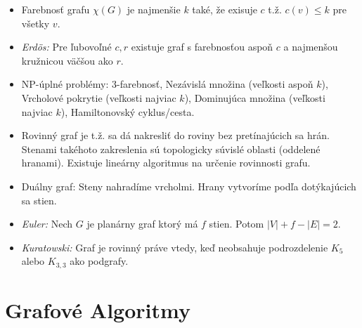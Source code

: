 \documentclass[paper=a4, fontsize=11pt]{scrartcl} %
\numberwithin{equation}{section} %
\numberwithin{figure}{section} %
\numberwithin{table}{section} %
\begin{document}
\begin{itemize}
		\item Farebnosť grafu $\chi(G)$ je najmenšie $k$ také, že exisuje $c$ t.ž. $c(v) \leq k$ pre všetky $v$.
		
		\item \emph{Erdös:} Pre ľubovoľné $c,r$ existuje graf s farebnosťou aspoň $c$ a najmenšou kružnicou väčšou ako $r$.
		
		\item NP-úplné problémy: 3-farebnosť, Nezávislá množina (veľkosti aspoň $k$), Vrcholové pokrytie (veľkosti najviac $k$), Dominujúca množina (veľkosti najviac $k$), Hamiltonovský cyklus/cesta.
		
		\item Rovinný graf je t.ž. sa dá nakresliť do roviny bez pretínajúcich sa hrán. Stenami takéhoto zakreslenia sú topologicky súvislé oblasti (oddelené hranami). Existuje lineárny algoritmus na určenie rovinnosti grafu.
		
		\item Duálny graf: Steny nahradíme vrcholmi. Hrany vytvoríme podľa dotýkajúcich sa stien.
		
		\item \emph{Euler:} Nech $G$ je planárny graf ktorý má $f$ stien. Potom $|V| + f - |E| = 2$.
		
		\item \emph{Kuratowski:} Graf je rovinný práve vtedy, keď neobsahuje podrozdelenie $K_5$ alebo $K_{3,3}$ ako podgrafy.
		
	\end{itemize}
	
	\section{Grafové Algoritmy}
	
\end{document}
